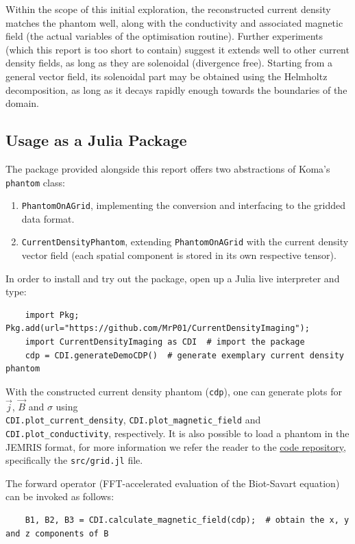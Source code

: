 \documentclass[10pt]{article}
\begin{document}
  Within the scope of this initial exploration, the reconstructed current density matches the phantom well, along with the conductivity and associated magnetic field (the actual variables of the optimisation routine).
  Further experiments (which this report is too short to contain) suggest it extends well to other current density fields, as long as they are solenoidal (divergence free).
  Starting from a general vector field, its solenoidal part may be obtained using the Helmholtz decomposition, as long as it decays rapidly enough towards the boundaries of the domain.

  \subsection{Usage as a Julia Package}
  The package provided alongside this report offers two abstractions of Koma's \texttt{phantom} class:
  \begin{enumerate}
    \item \texttt{PhantomOnAGrid}, implementing the conversion and interfacing to the gridded data format.
    \item \texttt{CurrentDensityPhantom}, extending \texttt{PhantomOnAGrid} with the current density vector field (each spatial component is stored in its own respective tensor).
  \end{enumerate}

  In order to install and try out the package, open up a Julia live interpreter and type:
  \begin{verbatim}
    import Pkg; Pkg.add(url="https://github.com/MrP01/CurrentDensityImaging");
    import CurrentDensityImaging as CDI  # import the package
    cdp = CDI.generateDemoCDP()  # generate exemplary current density phantom
  \end{verbatim}

  With the constructed current density phantom (\texttt{cdp}), one can generate plots for $\vec{j}$, $\vec{B}$ and $\sigma$ using \\
  \texttt{CDI.plot\_current\_density},
  \texttt{CDI.plot\_magnetic\_field} and
  \texttt{CDI.plot\_conductivity}, respectively.
  It is also possible to load a phantom in the JEMRIS format, for more information we refer the reader to the \href{https://github.com/MrP01/CurrentDensityImaging}{code repository}, specifically the \texttt{src/grid.jl} file.

  The forward operator (FFT-accelerated evaluation of the Biot-Savart equation) can be invoked as follows:
  \begin{verbatim}
    B1, B2, B3 = CDI.calculate_magnetic_field(cdp);  # obtain the x, y and z components of B
  \end{verbatim}
\end{document}
